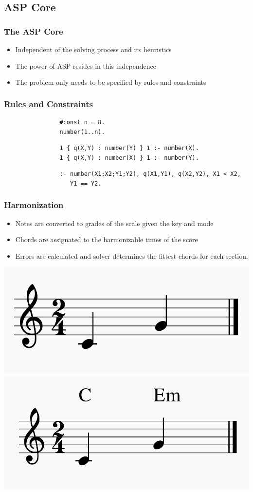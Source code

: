 \documentclass[english]{beamer}
\begin{document}
\subsection{ASP Core}
	\begin{frame}
		\frametitle{The ASP Core}
		\begin{itemize}
			\item Independent of the solving process and its heuristics
			\item The power of ASP resides in this independence
			\item The problem only needs to be specified by rules and constraints
		\end{itemize}
	\end{frame}
	\begin{frame}[fragile]
		\frametitle{Rules and Constraints}
		\begin{example}
			\begin{verbatim}
				#const n = 8.
				number(1..n).
			\end{verbatim}
		\end{example}
		\begin{example}
			\begin{verbatim}
				1 { q(X,Y) : number(Y) } 1 :- number(X).
				1 { q(X,Y) : number(X) } 1 :- number(Y).
			\end{verbatim}
		\end{example}
		\begin{example}[Constraint]
			\begin{verbatim}
				:- number(X1;X2;Y1;Y2), q(X1,Y1), q(X2,Y2), X1 < X2,
				   Y1 == Y2.
			\end{verbatim}
		\end{example}
	\end{frame}
	\begin{frame}
	\frametitle{Harmonization}
	\begin{itemize}
		\item Notes are converted to grades of the scale given the key and mode
		\item Chords are assignated to the harmonizable times of the score
		\item Errors are calculated and solver determines the fittest chords for each section.
	\end{itemize}
	\begin{center}
			\includegraphics[width=0.39\linewidth]{imagenes/example_notes.png}
			\includegraphics[width=0.39\linewidth]{imagenes/harmonized_example.png}
	\end{center}

	\end{frame}
\end{document}
